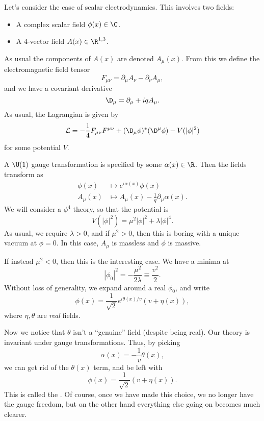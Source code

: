 \documentclass[a4paper]{article}
\begin{document}
Let's consider the case of scalar electrodynamics. This involves two fields:
\begin{itemize}
  \item A complex scalar field $\phi(x) \in \C$.
  \item A 4-vector field $A(x) \in \R^{1, 3}$.
\end{itemize}
As usual the components of $A(x)$ are denoted $A_\mu(x)$. From this we define the electromagnetic field tensor
\[
  F_{\mu\nu} = \partial_\mu A_\nu - \partial_\nu A_\mu,
\]
and we have a covariant derivative
\[
  \D_\mu = \partial_\mu + i q A_\mu.
\]
As usual, the Lagrangian is given by
\[
  \mathcal{L} = -\frac{1}{4} F_{\mu\nu} F^{\mu\nu} + (\D_\mu \phi)^* (\D^\mu \phi) - V(|\phi|^2)
\]
for some potential $V$.

A $\U(1)$ gauge transformation is specified by some $\alpha(x) \in \R$. Then the fields transform as
\begin{align*}
  \phi(x) &\mapsto e^{i\alpha(x)} \phi(x)\\
  A_\mu(x) &\mapsto A_\mu(x) - \frac{1}{q} \partial_\mu \alpha(x).
\end{align*}
We will consider a $\phi^4$ theory, so that the potential is
\[
  V(|\phi|^2) = \mu^2 |\phi|^2 + \lambda |\phi|^4.
\]
As usual, we require $\lambda > 0$, and if $\mu^2 > 0$, then this is boring with a unique vacuum at $\phi = 0$. In this case, $A_\mu$ is massless and $\phi$ is massive.

If instead $\mu^2 < 0$, then this is the interesting case. We have a minima at
\[
  |\phi_0|^2 = -\frac{\mu^2}{2\lambda} \equiv \frac{v^2}{2}.
\]
Without loss of generality, we expand around a real $\phi_0$, and write
\[
  \phi(x) = \frac{1}{\sqrt{2}} e^{i \theta(x)/v} (v + \eta(x)),
\]
where $\eta, \theta$ are \emph{real} fields.

Now we notice that $\theta$ isn't a ``genuine'' field (despite being real). Our theory is invariant under gauge transformations. Thus, by picking
\[
  \alpha(x) = - \frac{1}{v} \theta(x),
\]
we can get rid of the $\theta(x)$ term, and be left with
\[
  \phi(x) = \frac{1}{\sqrt{2}}(v + \eta(x)).
\]
This is called the . Of course, once we have made this choice, we no longer have the gauge freedom, but on the other hand everything else going on becomes much clearer.
\end{document}

